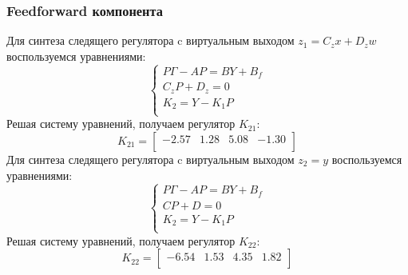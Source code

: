 \subsubsection{Feedforward компонента}
Для синтеза следящего регулятора c виртуальным выходом $z_1 = C_zx + D_z w$ воспользуемся уравнениями: 
\begin{equation}
    \begin{cases}
        P\Gamma - AP = BY + B_f \\
        C_z P + D_z = 0 \\ 
        K_2 = Y - K_1 P \\ 
    \end{cases}
\end{equation}
Решая систему уравнений, получаем регулятор $K_{21}$: 
\begin{equation}
    K_{21} = \begin{bmatrix}
        -2.57  & 1.28  & 5.08  & -1.30 \\ 
    \end{bmatrix}    
\end{equation}
Для синтеза следящего регулятора c виртуальным выходом $z_2 = y$ воспользуемся уравнениями:
\begin{equation}
    \begin{cases}
        P\Gamma - AP = BY + B_f \\
        C P + D = 0 \\ 
        K_2 = Y - K_1 P \\ 
    \end{cases}
\end{equation}
Решая систему уравнений, получаем регулятор $K_{22}$:
\begin{equation}
    K_{22} = \begin{bmatrix}
        -6.54  & 1.53  & 4.35  & 1.82 \\ 
    \end{bmatrix}
\end{equation}

